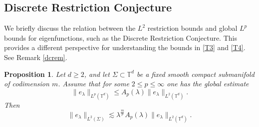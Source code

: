 \documentclass[11pt,reqno]{amsart}
\newtheorem{proposition}[theorem]{Proposition}
\numberwithin{equation}{section}
\newcommand{\1}{\textbf{1}}
\newcommand{\T}{\mathbb T}
\begin{document}
	\subsection{Discrete Restriction Conjecture}
	We briefly discuss the relation between the $L^2$ restriction bounds and global $L^p$ bounds for eigenfunctions, such as the Discrete Restriction Conjecture. This provides a different perspective for understanding the bounds in \eqref{T3} and \eqref{T4}. See Remark \ref{dcrem}.
	
	\begin{proposition}
		Let \(d\ge 2\), and let \(\Sigma\subset \T^d\) be a fixed smooth compact
		submanifold of codimension $m$.
		Assume that for some \(2\le p\le \infty\) one has the global estimate
		\begin{equation}\label{Lp-assumption}
			\|e_\lambda\|_{L^p(\T^d)}
			\le A_p(\lambda)
			\|e_\lambda\|_{L^2(\T^d)} .
		\end{equation}
		Then
		\begin{equation}\label{general-restriction-bound}
			\|e_\lambda\|_{L^2(\Sigma)}
			\lesssim
			\lambda^{\frac{m}p}
			A_p(\lambda)
			\|e_\lambda\|_{L^2(\T^d)}.
		\end{equation}
	\end{proposition}
\end{document}
